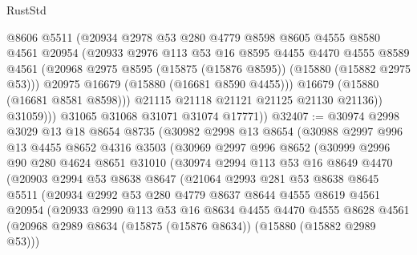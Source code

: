 \begin{lexlean}{RustStd}
\begin{coremodule}
                  @8606
                  @5511
                  (@20934
                    @2978
                    @53
                    @280
                    @4779
                    @8598
                    @8605
                    @4555
                    @8580
                    @4561
                    @20954
                    (@20933
                      @2976
                      @113
                      @53
                      @16
                      @8595
                      @4455
                      @4470
                      @4555
                      @8589
                      @4561
                      (@20968 @2975 @8595 (@15875 (@15876 @8595)) (@15880 (@15882 @2975 @53)))
                      @20975
                      @16679
                      (@15880 (@16681 @8590 @4455)))
                    @16679
                    (@15880 (@16681 @8581 @8598)))
                  @21115
                  @21118
                  @21121
                  @21125
                  @21130
                  @21136))
              @31059)))
        @31065
        @31068
        @31071
        @31074
        @17771))
@32407 := @30974
    @2998
    @3029
    @13
    @18
    @8654
    @8735
    (@30982
      @2998
      @13
      @8654
      (@30988
        @2997
        @996
        @13
        @4455
        @8652
        @4316
        @3503
        (@30969
          @2997
          @996
          @8652
          (@30999
            @2996
            @90
            @280
            @4624
            @8651
            @31010
            (@30974
              @2994
              @113
              @53
              @16
              @8649
              @4470
              (@20903
                @2994
                @53
                @8638
                @8647
                (@21064
                  @2993
                  @281
                  @53
                  @8638
                  @8645
                  @5511
                  (@20934
                    @2992
                    @53
                    @280
                    @4779
                    @8637
                    @8644
                    @4555
                    @8619
                    @4561
                    @20954
                    (@20933
                      @2990
                      @113
                      @53
                      @16
                      @8634
                      @4455
                      @4470
                      @4555
                      @8628
                      @4561
                      (@20968 @2989 @8634 (@15875 (@15876 @8634)) (@15880 (@15882 @2989 @53)))

\end{coremodule}
\end{lexlean}
